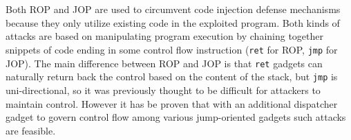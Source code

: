 \documentclass{article}
\begin{document}
\section{}
Both ROP and JOP are used to circumvent code injection defense mechanisms because they only utilize existing code in the exploited program. Both kinds of attacks are based on manipulating program execution by chaining together snippets of code ending in some control flow instruction (\texttt{ret} for ROP, \texttt{jmp} for JOP). The main difference between ROP and JOP is that \texttt{ret} gadgets can naturally return back the control based on the content of the stack, but \texttt{jmp} is uni-directional, so it was previously thought to be difficult for attackers to maintain control. However it has be proven that with an additional dispatcher gadget to govern control flow among various jump-oriented gadgets such attacks are feasible.
\end{document}
